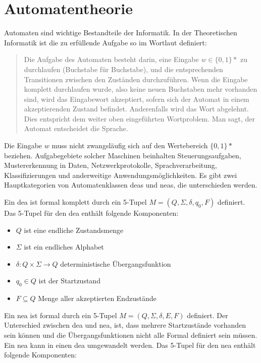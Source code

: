 \section{Automatentheorie}\label{automatatheory}
Automaten sind wichtige Bestandteile der Informatik. In der Theoretischen Informatik ist die zu erfüllende Aufgabe so im Wortlaut definiert:

\begin{quote}
\glqq Die Aufgabe des Automaten besteht darin, eine Eingabe $w \in \{0, 1 \}\ast$ zu
durchlaufen (Buchstabe für Buchstabe), und die entsprechenden Transitionen
zwischen den Zuständen durchzuführen. Wenn die Eingabe komplett
durchlaufen wurde, also keine neuen Buchstaben mehr vorhanden sind, wird
das Eingabewort akzeptiert, sofern sich der Automat in einem akzeptierenden
Zustand befindet. Anderenfalls wird das Wort abgelehnt. Dies entspricht dem
weiter oben eingeführten Wortproblem. Man sagt, der Automat entscheidet
die Sprache.\grqq \cite{theororeticalinformatic}
\end{quote}

Die Eingabe $w$ muss nicht zwangsläufig sich auf den Wertebereich $\{0, 1 \}\ast$ beziehen. Aufgabegebiete solcher Maschinen beinhalten Steuerungsaufgaben, Mustererkennung in Daten, Netzwerkprotokolle, Sprachverarbeitung, Klassifizierungen und anderweitige Anwendungsmöglichkeiten. Es gibt zwei Hauptkategorien von Automatenklassen \acp{dea} und \acp{nea}, die unterschieden werden.

Ein \ac{dea} ist formal komplett durch ein 5-Tupel $M = (Q, \Sigma, \delta, q_0, F)$ definiert. Das 5-Tupel für den \ac{dea} enthält folgende Komponenten:

\begin{itemize}
  \setlength\itemsep{-0.6em}
\item $Q$  ist eine endliche Zustandsmenge
\item $\Sigma$ ist ein endliches Alphabet
\item $\delta:Q \times \Sigma \rightarrow Q$ deterministische Übergangsfunktion
\item $q_0 \in Q$ ist der Startzustand
\item $F \subseteq Q$ Menge aller akzeptierten Endzustände
\end{itemize}


Ein \ac{nea} ist formal durch ein 5-Tupel $M = (Q, \Sigma, \delta, E, F)$ definiert. Der Unterschied zwischen \ac{dea} und \ac{nea}, ist, dass mehrere Startzustände vorhanden sein können und die Übergangsfunktionen nicht alle Formal definiert sein müssen. Ein \ac{nea} kann in einen \ac{dea} umgewandelt werden. Das 5-Tupel für den \ac{nea} enthält folgende Komponenten:

